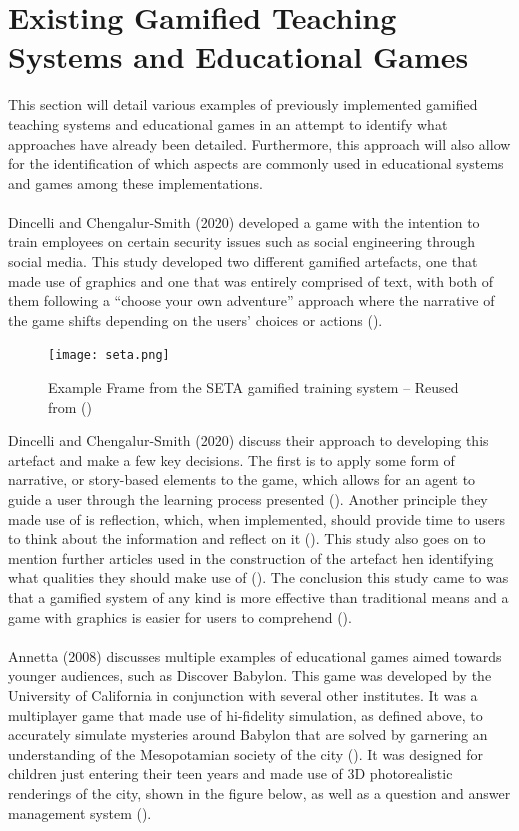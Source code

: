 \section{Existing Gamified Teaching Systems and Educational Games}
This section will detail various examples of previously implemented gamified teaching systems and educational games in an attempt to identify what approaches have already been detailed. Furthermore, this approach will also allow for the identification of which aspects are commonly used in educational systems and games among these implementations. 
\\\\
Dincelli and Chengalur-Smith (2020) developed a game with the intention to train employees on certain security issues such as social engineering through social media. This study developed two different gamified artefacts, one that made use of graphics and one that was entirely comprised of text, with both of them following a “choose your own adventure” approach where the narrative of the game shifts depending on the users’ choices or actions (\cite{Dincelli2020}).

\begin{figure}[H]
\centering
\centerline{\texttt{[image: seta.png]}}
\caption{Example Frame from the SETA gamified training system – Reused from (\cite{Dincelli2020})}
\end{figure}

Dincelli and Chengalur-Smith (2020) discuss their approach to developing this artefact and make a few key decisions. The first is to apply some form of narrative, or story-based elements to the game, which allows for an agent to guide a user through the learning process presented (\cite{Dincelli2020, Sheng2007}). Another principle they made use of is reflection, which, when implemented, should provide time to users to think about the information and reflect on it (\cite{Dincelli2020, Sheng2007}). This study also goes on to mention further articles used in the construction of the artefact hen identifying what qualities they should make use of (\cite{Dincelli2020, Liu2017}). The conclusion this study came to was that a gamified system of any kind is more effective than traditional means and a game with graphics is easier for users to comprehend (\cite{Dincelli2020}).
\\\\
Annetta (2008) discusses multiple examples of educational games aimed towards younger audiences, such as Discover Babylon. This game was developed by the University of California in conjunction with several other institutes. It was a multiplayer game that made use of hi-fidelity simulation, as defined above, to accurately simulate mysteries around Babylon that are solved by garnering an understanding of the Mesopotamian society of the city (\cite{Annetta2008}). It was designed for children just entering their teen years and made use of 3D photorealistic renderings of the city, shown in the figure below, as well as a question and answer management system (\cite{Annetta2008}). 

